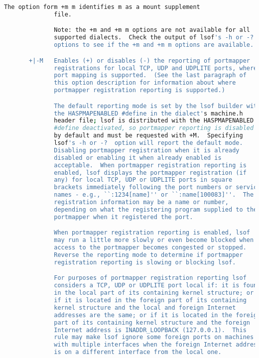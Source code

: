 {{\begin{lstlisting}[language=bash]
              The option form +m m identifies m as a mount supplement
              file.

              Note: the +m and +m m options are not available for all
              supported dialects.  Check the output of lsof's -h or -?
              options to see if the +m and +m m options are available.

       +|-M   Enables (+) or disables (-) the reporting of portmapper
              registrations for local TCP, UDP and UDPLITE ports, where
              port mapping is supported.  (See the last paragraph of
              this option description for information about where
              portmapper registration reporting is supported.)

              The default reporting mode is set by the lsof builder with
              the HASPMAPENABLED #define in the dialect's machine.h
              header file; lsof is distributed with the HASPMAPENABLED
              #define deactivated, so portmapper reporting is disabled
              by default and must be requested with +M.  Specifying
              lsof's -h or -?  option will report the default mode.
              Disabling portmapper registration when it is already
              disabled or enabling it when already enabled is
              acceptable.  When portmapper registration reporting is
              enabled, lsof displays the portmapper registration (if
              any) for local TCP, UDP or UDPLITE ports in square
              brackets immediately following the port numbers or service
              names - e.g., ``:1234[name]'' or ``:name[100083]''.  The
              registration information may be a name or number,
              depending on what the registering program supplied to the
              portmapper when it registered the port.

              When portmapper registration reporting is enabled, lsof
              may run a little more slowly or even become blocked when
              access to the portmapper becomes congested or stopped.
              Reverse the reporting mode to determine if portmapper
              registration reporting is slowing or blocking lsof.

              For purposes of portmapper registration reporting lsof
              considers a TCP, UDP or UDPLITE port local if: it is found
              in the local part of its containing kernel structure; or
              if it is located in the foreign part of its containing
              kernel structure and the local and foreign Internet
              addresses are the same; or if it is located in the foreign
              part of its containing kernel structure and the foreign
              Internet address is INADDR_LOOPBACK (127.0.0.1).  This
              rule may make lsof ignore some foreign ports on machines
              with multiple interfaces when the foreign Internet address
              is on a different interface from the local one.


\end{lstlisting}}}
